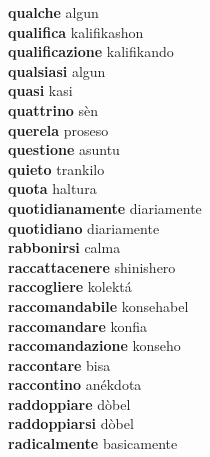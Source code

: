 \textbf{qualche } algun \\
\textbf{qualifica } kalifikashon \\
\textbf{qualificazione } kalifikando \\
\textbf{qualsiasi } algun \\
\textbf{quasi } kasi \\
\textbf{quattrino } sèn \\
\textbf{querela } proseso \\
\textbf{questione } asuntu \\
\textbf{quieto } trankilo \\
\textbf{quota } haltura \\
\textbf{quotidianamente } diariamente \\
\textbf{quotidiano } diariamente \\
\textbf{rabbonirsi } calma \\
\textbf{raccattacenere } shinishero \\
\textbf{raccogliere } kolektá \\
\textbf{raccomandabile } konsehabel \\
\textbf{raccomandare } konfia \\
\textbf{raccomandazione } konseho \\
\textbf{raccontare } bisa \\
\textbf{raccontino } anékdota \\
\textbf{raddoppiare } dòbel \\
\textbf{raddoppiarsi } dòbel \\
\textbf{radicalmente } basicamente \\

